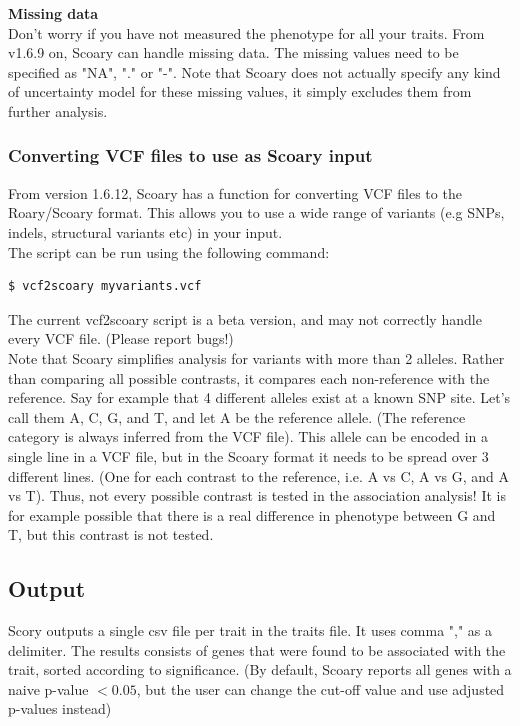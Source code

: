\documentclass{article}
\begin{document}

        \textbf{Missing data} \\
        Don't worry if you have not measured the phenotype for all your traits. From v1.6.9 on, Scoary can handle missing data. The missing values need to be specified as "NA", "." or "-". Note that Scoary does not actually specify any kind of uncertainty model for these missing values, it simply excludes them from further analysis. \\
    
      \subsubsection{Converting VCF files to use as Scoary input}
        From version 1.6.12, Scoary has a function for converting VCF files to the Roary/Scoary format. This allows you to use a wide range of variants (e.g SNPs, indels, structural variants etc) in your input.\\

        The script can be run using the following command:
        \begin{lstlisting}[language=python, basicstyle=\small]
          $ vcf2scoary myvariants.vcf
        \end{lstlisting}

        The current vcf2scoary script is a beta version, and may not correctly handle every VCF file. (Please report bugs!) \\

        Note that Scoary simplifies analysis for variants with more than 2 alleles. Rather than comparing all possible contrasts, it compares each non-reference with the reference. Say for example that 4 different alleles exist at a known SNP site. Let's call them A, C, G, and T, and let A be the reference allele. (The reference category is always inferred from the VCF file). This allele can be encoded in a single line in a VCF file, but in the Scoary format it needs to be spread over 3 different lines. (One for each contrast to the reference, i.e. A vs C, A vs G, and A vs T). Thus, not every possible contrast is tested in the association analysis! It is for example possible that there is a real difference in phenotype between G and T, but this contrast is not tested.
    
    \subsection{Output}
      Scory outputs a single csv file per trait in the traits file. It uses comma "," as a delimiter. The results consists of genes that were found to be associated with the trait, sorted according to significance. (By default, Scoary reports all genes with a naive p-value $< 0.05$, but the user can change the cut-off value and use adjusted p-values instead) \\
\end{document}
